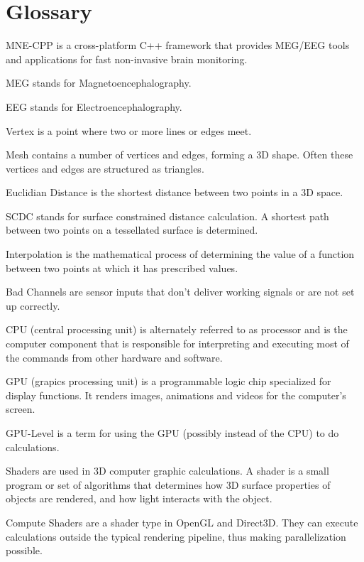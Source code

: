 \section{Glossary}

\begin{aims}
	
	\item[MNE-CPP] is a cross-platform C++ framework that provides MEG/EEG tools and applications for fast non-invasive brain 						monitoring.
	\item[MEG] stands for Magnetoencephalography. 
	\item[EEG] stands for Electroencephalography.
	\item[Vertex] is a point where two or more lines or edges meet.
	\item[Mesh]	contains a number of vertices and edges, forming a 3D shape. Often these vertices and edges are structured as 					triangles.
	\item[Euclidian Distance] is the shortest distance between two points in a 3D space.
	\item[SCDC]stands for surface constrained distance calculation. A shortest path between two points on a tessellated 					   surface is determined.
	\item[Interpolation] is the mathematical process of determining the value of a function between two points at which it has 						 prescribed values.
	\item[Bad Channels] are sensor inputs that don't deliver working signals or are not set up correctly.
	\item[CPU] (central processing unit) is alternately referred to as processor and is the computer component 				   			   that is responsible for interpreting and executing most of the commands from other hardware and software.
	\item[GPU] (grapics processing unit) is a programmable logic chip specialized for display functions. It renders images, 				   animations and videos for the computer's screen. 	
	\item[GPU-Level] is a term for using the GPU (possibly instead of the CPU) to do calculations.
	\item[Shaders] are used in 3D computer graphic calculations. A shader is a small program or set of algorithms that 							   determines how 3D surface properties of objects are rendered, and how light interacts with the object. 		
	\item[Compute Shaders] are a shader type in OpenGL and Direct3D. They can execute calculations outside the typical 									   rendering pipeline, thus making parallelization possible.

\end{aims}

